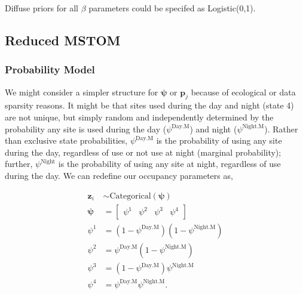 \documentclass[12pt]{article}
\begin{document}
Diffuse priors for all $\beta$ parameters could be specifed as Logistic(0,1).

\subsection{Reduced MSTOM}
\subsubsection{Probability Model}
We might consider a simpler structure for $\boldsymbol{\psi}$ or $\boldsymbol{p}_{j}$ because of ecological or data sparsity reasons. It might be that sites used during the day and night (state 4) are not unique, but simply random and independently determined by the probability any site is used during the day ($\psi^{\text{Day.M}}$) and night ($\psi^{\text{Night.M}}$). Rather than exclusive state probabilities, $\psi^{\text{Day.M}}$ is the probability of using any site during the day, regardless of use or not use at night (marginal probability); further, $\psi^{\text{Night}}$ is the probability of using any site at night, regardless of use during the day.  We can redefine our occupancy parameters as,
\begin{center}
\begin{align*}
\textbf{z}_{i} &\sim \text{Categorical}(\boldsymbol{\psi})\\
\boldsymbol{\psi} &= \begin{bmatrix} \psi^1 & \psi^2 & \psi^3 & \psi^4 \end{bmatrix}\\
\psi^1 &=(1-\psi^{\text{Day.M}})(1-\psi^{\text{Night.M}})\\
\psi^2 &=\psi^{\text{Day.M}}(1-\psi^{\text{Night.M}})\\
\psi^3 &=(1-\psi^{\text{Day.M}})\psi^{\text{Night.M}}\\
\psi^4 &=\psi^{\text{Day.M}}\psi^{\text{Night.M}}.\\
\end{align*}
\end{center}
\end{document}
